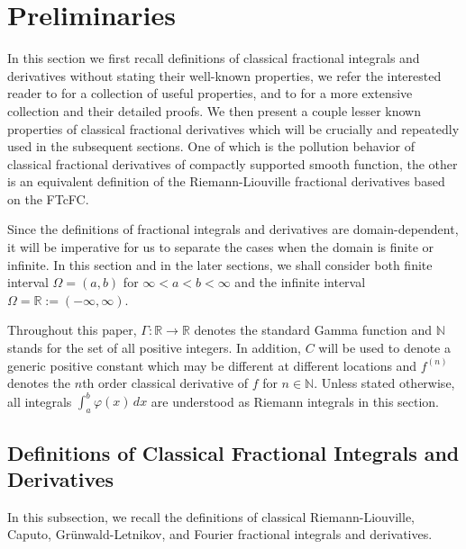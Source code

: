 \documentclass[leqno,final]{siamltex}
\numberwithin{equation}{section}
\renewcommand{\(}{\bigl(}
\renewcommand{\)}{\bigr)}
\newcommand{\R}{\mathbb{R}}
\newcommand{\N}{\mathbb{N}}
\begin{document}
\section{Preliminaries}\label{sec-2}
    In this section we first recall definitions of classical fractional integrals and derivatives %
    without stating their well-known properties, we refer 
    the interested reader to \cite{Feng_Sutton} for a collection of useful properties, 
    and to \cite{Samko} for a more extensive collection and their detailed proofs. 
%
    We then present a couple lesser known properties of classical fractional derivatives which will be crucially and repeatedly used in the subsequent sections. One of which is the pollution behavior of classical fractional derivatives of compactly supported smooth function, the other is an equivalent definition of the Riemann-Liouville fractional derivatives based 
    on the FTcFC. 
     

    Since the definitions of fractional integrals and derivatives are domain-dependent, it will be imperative for us to separate the cases when the domain is finite or infinite. In this section and in the later sections, we shall consider both finite interval $\Omega=(a,b)$ for $\infty < a < b < \infty$ and the infinite interval $\Omega=\R:=(-\infty, \infty)$. 

    Throughout this paper, $\Gamma: \R\to \R$ denotes the standard Gamma function and $\N$ stands for the set of all positive integers. In addition, $C$ will be used to denote a generic positive constant which may be different at different locations and $f^{(n)}$ denotes the $n$th order classical derivative of $f$ for $n\in\N$. Unless stated otherwise, all integrals $\int_a^b \varphi(x)\, dx$ are understood as Riemann integrals in this section. 
    
    \subsection{Definitions of Classical Fractional Integrals and Derivatives}\label{sec-2.1}
     In this subsection, we recall the definitions %
        of classical Riemann-Liouville, Caputo, Gr\"{u}nwald-Letnikov, and Fourier fractional integrals and derivatives. 
\end{document}
